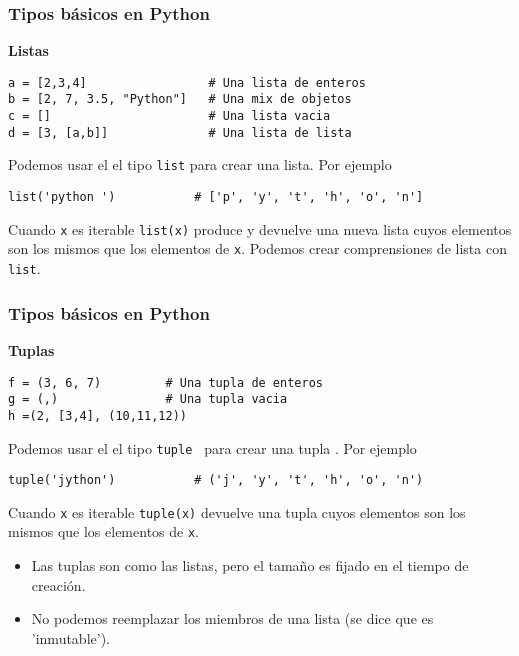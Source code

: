 \documentclass[10pt]{beamer}
\begin{document}
\begin{frame}[fragile]
\frametitle{Tipos b\'asicos en Python }
\textbf{Listas}

\vspace{0.2cm}

\begin{lstlisting}
a = [2,3,4]                 # Una lista de enteros
b = [2, 7, 3.5, "Python"]   # Una mix de objetos
c = []                      # Una lista vacia
d = [3, [a,b]]              # Una lista de lista
\end{lstlisting}

\vspace{0.2cm}

Podemos usar el el tipo \texttt{list} para crear una lista. Por ejemplo 


\vspace{0.2cm}

\begin{lstlisting}
list('python ')           # ['p', 'y', 't', 'h', 'o', 'n']
\end{lstlisting}

\vspace{0.2cm}

Cuando \texttt{x} es iterable \texttt{list(x)} produce y devuelve una nueva lista cuyos elementos son los mismos que los elementos de \texttt{x}. Podemos crear comprensiones de lista con \texttt{list}.

\end{frame}
\begin{frame}[fragile]
\frametitle{Tipos b\'asicos en Python}
\textbf{Tuplas}

\begin{lstlisting}
f = (3, 6, 7)         # Una tupla de enteros
g = (,)               # Una tupla vacia
h =(2, [3,4], (10,11,12))   
\end{lstlisting}




\vspace{0.2cm}

Podemos usar el el tipo \texttt{tuple } para crear una tupla . Por ejemplo 


\vspace{0.2cm}

\begin{lstlisting}
tuple('jython')           # ('j', 'y', 't', 'h', 'o', 'n')
\end{lstlisting}

\vspace{0.2cm}

Cuando \texttt{x} es iterable \texttt{tuple(x)} devuelve una tupla  cuyos elementos son los mismos que los elementos de \texttt{x}.


\vspace{0.2cm}
\begin{itemize}
\item Las tuplas son como las listas, pero el tama\~no es fijado en el tiempo de creaci\'on.
\item No podemos reemplazar los miembros de una lista (se dice que es 'inmutable').
\end{itemize}
\end{frame}
\end{document}

